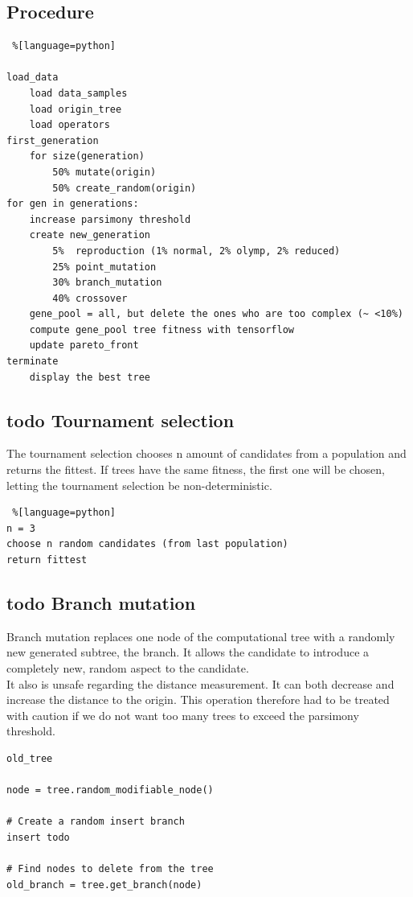 \subsection{Procedure}

\begin{lstlisting} %[language=python]

load_data
    load data_samples
    load origin_tree
    load operators
first_generation
    for size(generation)
        50% mutate(origin)
        50% create_random(origin)
for gen in generations:
    increase parsimony threshold
    create new_generation
        5%  reproduction (1% normal, 2% olymp, 2% reduced)
        25% point_mutation
        30% branch_mutation
        40% crossover
    gene_pool = all, but delete the ones who are too complex (~ <10%)
    compute gene_pool tree fitness with tensorflow
    update pareto_front
terminate
    display the best tree
\end{lstlisting}

\subsection{todo Tournament selection}

The tournament selection chooses n amount of candidates from a population and returns the fittest. If trees have the same fitness, the first one will be chosen, letting the tournament selection be non-deterministic.

\begin{lstlisting} %[language=python]
n = 3
choose n random candidates (from last population)
return fittest
\end{lstlisting}

\subsection{todo Branch mutation}

Branch mutation replaces one node of the computational tree with a randomly new generated subtree, the branch. It allows the candidate to introduce a completely new, random aspect to the candidate.\\
It also is unsafe regarding the distance measurement. It can both decrease and increase the distance to the origin. This operation therefore had to be treated with caution if we do not want too many trees to exceed the parsimony threshold.

\begin{lstlisting}
old_tree

node = tree.random_modifiable_node()

# Create a random insert branch
insert todo

# Find nodes to delete from the tree
old_branch = tree.get_branch(node)

\end{lstlisting}

